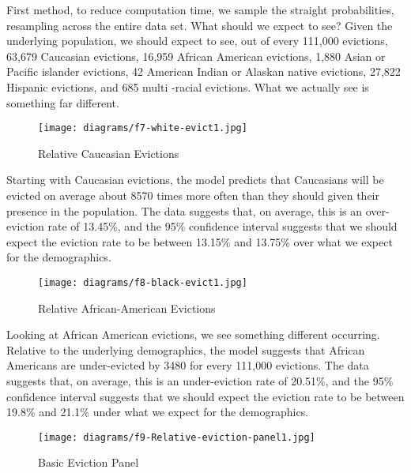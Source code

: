 \par First method, to reduce computation time, we sample the straight probabilities, resampling across the entire data set.  What should we expect to see?  Given the underlying population, we should expect to see, out of every 111,000 evictions, 63,679 Caucasian evictions, 16,959 African American evictions, 1,880 Asian or Pacific islander evictions, 42 American Indian or Alaskan native evictions, 27,822 Hispanic evictions, and 685 multi -racial evictions.  What we actually see is something far different.

\begin{wrapfigure}{r}{2in}
\texttt{[image: diagrams/f7-white-evict1.jpg]}
\caption{Relative Caucasian Evictions}
\label{fig:figure7}
\end{wrapfigure}

\par Starting with Caucasian evictions, the model predicts that Caucasians will be evicted on average about 8570 times more often than they should given their presence in the population.  The data suggests that, on average, this is an over-eviction rate of 13.45\%, and the 95\% confidence interval suggests that we should expect the eviction rate to be between 13.15\% and 13.75\% over what we expect for the demographics.

\begin{wrapfigure}{r}{2in}
\texttt{[image: diagrams/f8-black-evict1.jpg]}
\caption{Relative African-American Evictions}
\label{fig:figure8}
\end{wrapfigure}

\par Looking at African American evictions, we see something different occurring.  Relative to the underlying demographics, the model suggests that African Americans are under-evicted by 3480 for every 111,000 evictions.  The data suggests that, on average, this is an under-eviction rate of 20.51\%, and the 95\% confidence interval suggests that we should expect the eviction rate to be between 19.8\% and 21.1\% under what we expect for the demographics.

\begin{figure}
  \begin{center}
    \texttt{[image: diagrams/f9-Relative-eviction-panel1.jpg]}
  \end{center}
  \caption{Basic Eviction Panel}
\label{fig:figure9}
\end{figure}

